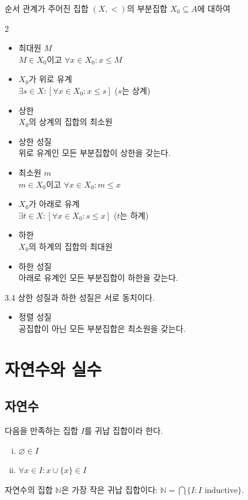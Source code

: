 \documentclass{article}
\begin{document}
\noindent 순서 관계가 주어진 집합 $(X,<)$의 부분집합 $X_0\subseteq A$에 대하여
\begin{multicols}{2}
    \begin{itemize}
        \item 최대원 $M$ \\
            $M\in X_0$이고 $\forall x\in X_0:x\leq M$
        \item $X_0$가 위로 유계 \\
            $\exists s\in X:[\forall x\in X_0:x\leq s]$ ($s$는 상계)
        \item 상한 \\
            $X_0$의 상계의 집합의 최소원
        \item 상한 성질 \\
        위로 유계인 모든 부분집합이 상한을 갖는다.
        \item 최소원 $m$ \\
            $m\in X_0$이고 $\forall x\in X_0:m\leq x$
        \item $X_0$가 아래로 유계 \\
            $\exists t\in X:[\forall x\in X_0:s\leq x]$ ($t$는 하계)
        \item 하한 \\
            $X_0$의 하계의 집합의 최대원
        \item 하한 성질 \\
        아래로 유계인 모든 부분집합이 하한을 갖는다.
    \end{itemize}
\end{multicols}

\begin{prop}{}{3.4}
    상한 성질과 하한 성질은 서로 동치이다.
\end{prop}

\begin{itemize}
    \item 정렬 성질 \\
        공집합이 아닌 모든 부분집합은 최소원을 갖는다.
\end{itemize}

\section{자연수와 실수}
\subsection{자연수}
다음을 만족하는 집합 $I$를 귀납 집합이라 한다.
\begin{enumerate}[(i)]
    \item $\varnothing\in I$
    \item $\forall x\in I:x\cup \{x\}\in I$
\end{enumerate}
자연수의 집합 $\mathbb N$은 가장 작은 귀납 집합이다: $\mathbb N=\bigcap\{I:I\text{ inductive}\}$.
\end{document}
